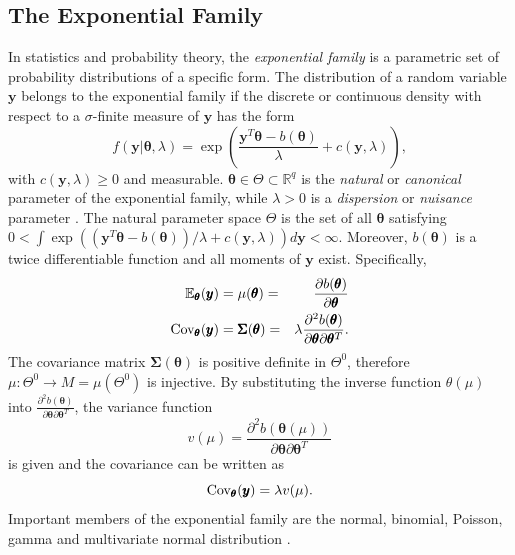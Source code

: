 \subsection{The Exponential Family}
In statistics and probability theory, the \textit{exponential family} is a parametric set of probability distributions of a specific form. The distribution of a random variable $\pmb{y}$ belongs to the exponential family if the discrete or continuous density with respect to a $\sigma$-finite measure of $\pmb{y}$ has the form
\begin{equation}
    f(\pmb{y}|\pmb{\theta}, \lambda)=\exp\left(\frac{\pmb{y}^T\pmb{\theta} - b(\pmb{\theta})}{\lambda}+c(\pmb{y},\lambda) \right),
\end{equation}
with $c(\pmb{y},\lambda)\geq 0$ and measurable. $\pmb{\theta}\in\Theta\subset\mathbb{R}^q$ is the \textit{natural} or \textit{canonical} parameter of the exponential family, while $\lambda > 0$ is a \textit{dispersion} or \textit{nuisance} parameter \autocite[][]{holland1981exponential}. The natural parameter space $\Theta$ is the set of all $\pmb{\theta}$ satisfying $0<\int\exp\left(\left(\pmb{y}^T\pmb{\theta} - b(\pmb{\theta})\right)/\lambda+c(\pmb{y},\lambda) \right)d\pmb{y}< \infty$. Moreover, $b(\pmb{\theta})$ is a twice differentiable  function and all moments of $\pmb{y}$ exist. Specifically, 
\begin{alignat}{3}
    \mathbb{E}_{\pmb{\theta}}(\pmb{y}) &= \mu(\pmb{\theta}) =& \frac{\partial b(\pmb{\theta})}{\partial\pmb{\theta}} \\
    \hbox{Cov}_{\pmb{\theta}}(\pmb{y}) &= \pmb{\Sigma}(\pmb{\theta}) =& \lambda\frac{\partial^2b(\pmb{\theta})}{\partial\pmb{\theta}\partial\pmb{\theta}^T}.
\end{alignat}
The covariance matrix $\pmb{\Sigma}(\pmb{\theta})$ is positive definite in $\Theta^0$, therefore $\mu:\Theta^0\rightarrow  M = \mu\left(\Theta^0\right)$ is injective. By substituting the inverse function $\theta(\mu)$ into $\frac{\partial^2b(\pmb{\theta})}{\partial\pmb{\theta}\partial\pmb{\theta}^T}$, the variance function 
\begin{equation}
    v(\mu)=\frac{\partial^2b(\pmb{\theta}(\mu))}{\partial\pmb{\theta}\partial\pmb{\theta}^T}
\end{equation}
is given and the covariance can be written as
\begin{equation}
    \hbox{Cov}_{\pmb{\theta}}(\pmb{y}) = \lambda v(\mu).
\end{equation}
Important members of the exponential family are the normal, binomial, Poisson, gamma and multivariate normal distribution \autocite[][433]{fahrmeir2013multivariate}.
